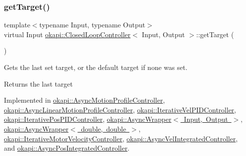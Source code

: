 \mbox{\label{classokapi_1_1ClosedLoopController_a22012bedbfaff6e5a3a508f274ec2497}} 
\subsubsection{\texorpdfstring{getTarget()}{getTarget()}}
{\footnotesize\ttfamily template$<$typename Input, typename Output$>$ \\
virtual Input \mbox{\hyperlink{classokapi_1_1ClosedLoopController}{okapi\+::\+Closed\+Loop\+Controller}}$<$ Input, Output $>$\+::get\+Target (\begin{DoxyParamCaption}{ }\end{DoxyParamCaption})\hspace{0.3cm}{\ttfamily [pure virtual]}}

Gets the last set target, or the default target if none was set.

\begin{DoxyReturn}{Returns}
the last target 
\end{DoxyReturn}


Implemented in \mbox{\hyperlink{classokapi_1_1AsyncMotionProfileController_a9f9e44e987481619cbec37d5e35c71e8}{okapi\+::\+Async\+Motion\+Profile\+Controller}}, \mbox{\hyperlink{classokapi_1_1AsyncLinearMotionProfileController_afc9a1b30a5fd499c38455e8b05982be9}{okapi\+::\+Async\+Linear\+Motion\+Profile\+Controller}}, \mbox{\hyperlink{classokapi_1_1IterativeVelPIDController_a5f2bbad6e916345f8a3abf762609321c}{okapi\+::\+Iterative\+Vel\+P\+I\+D\+Controller}}, \mbox{\hyperlink{classokapi_1_1IterativePosPIDController_a1c4c3a54b616e4250e65a88b0cb12276}{okapi\+::\+Iterative\+Pos\+P\+I\+D\+Controller}}, \mbox{\hyperlink{classokapi_1_1AsyncWrapper_a2471c7b5f388d441db77fa9199db7b83}{okapi\+::\+Async\+Wrapper$<$ Input, Output $>$}}, \mbox{\hyperlink{classokapi_1_1AsyncWrapper_a2471c7b5f388d441db77fa9199db7b83}{okapi\+::\+Async\+Wrapper$<$ double, double $>$}}, \mbox{\hyperlink{classokapi_1_1IterativeMotorVelocityController_a3e54865f6b424954f3846cd1361077c5}{okapi\+::\+Iterative\+Motor\+Velocity\+Controller}}, \mbox{\hyperlink{classokapi_1_1AsyncVelIntegratedController_a030ca47508587f799dfdd7d97ed86d7d}{okapi\+::\+Async\+Vel\+Integrated\+Controller}}, and \mbox{\hyperlink{classokapi_1_1AsyncPosIntegratedController_a8d09fefb4a02fcb9d0352b4aa68821e3}{okapi\+::\+Async\+Pos\+Integrated\+Controller}}.

